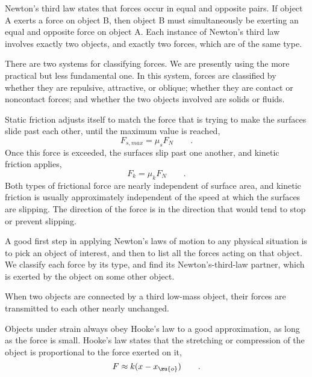 \begin{summary}
\begin{notation}
\end{notation}

\begin{summarytext}

Newton's third law states that forces occur in equal and
opposite pairs. If object A exerts a force on object B,
then object B must simultaneously be exerting an equal and
opposite force on object A. Each instance of Newton's third
law involves exactly two objects, and exactly two forces,
which are of the same type.

There are two systems for classifying forces. We are
presently using the more practical but less fundamental one.
In this system, forces are classified by whether they are
repulsive, attractive, or oblique; whether they are contact
or noncontact forces; and whether the two objects involved
are solids or fluids.

Static friction adjusts itself to match the force that is
trying to make the surfaces slide past each other, until the
maximum value is reached,
\begin{equation*}
        F_{s,max} = \mu_s F_N  \qquad .
\end{equation*}
Once this force is exceeded, the surfaces slip past one
another, and kinetic friction applies,
\begin{equation*}
        F_k = \mu_k F_N   \qquad   .
\end{equation*}
Both types of frictional force are nearly independent of
surface area, and kinetic friction is usually approximately
independent of the speed at which the surfaces are slipping.
The direction of the force is in the direction that would tend
to stop or prevent slipping.

A good first step in applying Newton's laws of motion to any
physical situation is to pick an object of interest, and
then to list all the forces acting on that object. We
classify each force by its type, and find its Newton's-third-law
partner, which is exerted by the object on some other object.

When two objects are connected by a third low-mass object,
their forces are transmitted to each other nearly unchanged.

Objects under strain always obey Hooke's law to a good
approximation, as long as the force is small. Hooke's law
states that the stretching or compression of the object is
proportional to the force exerted on it,
\begin{equation*}
    F \approx k(x-x_\zu{o})   \qquad   .
\end{equation*}

\end{summarytext}

\end{summary}
